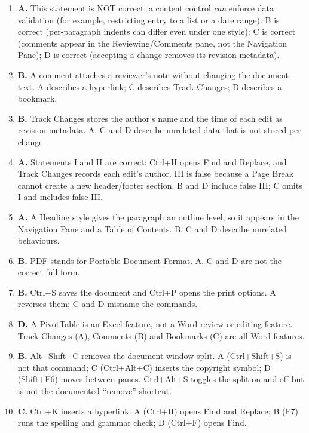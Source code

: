 \documentclass[11pt]{article}
\begin{document}
\begin{enumerate}[label=\textbf{Q\arabic*.}, leftmargin=*]
  formatting; C and D are false because headers/footers are fully editable and
  are not deleted on closing.
\item \textbf{A.} This statement is NOT correct: a content control \emph{can}
  enforce data validation (for example, restricting entry to a list or a date
  range). B is correct (per-paragraph indents can differ even under one
  style); C is correct (comments appear in the Reviewing/Comments pane, not the
  Navigation Pane); D is correct (accepting a change removes its revision
  metadata).
\item \textbf{B.} A comment attaches a reviewer's note without changing the
  document text. A describes a hyperlink; C describes Track Changes; D
  describes a bookmark.
\item \textbf{B.} Track Changes stores the author's name and the time of each
  edit as revision metadata. A, C and D describe unrelated data that is not
  stored per change.
\item \textbf{A.} Statements I and II are correct: Ctrl+H opens Find and
  Replace, and Track Changes records each edit's author. III is false because a
  Page Break cannot create a new header/footer section. B and D include false
  III; C omits I and includes false III.
\item \textbf{A.} A Heading style gives the paragraph an outline level, so it
  appears in the Navigation Pane and a Table of Contents. B, C and D describe
  unrelated behaviours.
\item \textbf{B.} PDF stands for Portable Document Format. A, C and D are not
  the correct full form.
\item \textbf{B.} Ctrl+S saves the document and Ctrl+P opens the print
  options. A reverses them; C and D misname the commands.
\item \textbf{D.} A PivotTable is an Excel feature, not a Word review or
  editing feature. Track Changes (A), Comments (B) and Bookmarks (C) are all
  Word features.
\item \textbf{B.} Alt+Shift+C removes the document window split. A
  (Ctrl+Shift+S) is not that command; C (Ctrl+Alt+C) inserts the copyright
  symbol; D (Shift+F6) moves between panes. Ctrl+Alt+S toggles the split on and
  off but is not the documented ``remove'' shortcut.
\item \textbf{C.} Ctrl+K inserts a hyperlink. A (Ctrl+H) opens Find and
  Replace; B (F7) runs the spelling and grammar check; D (Ctrl+F) opens Find.


\end{enumerate}
\end{document}
